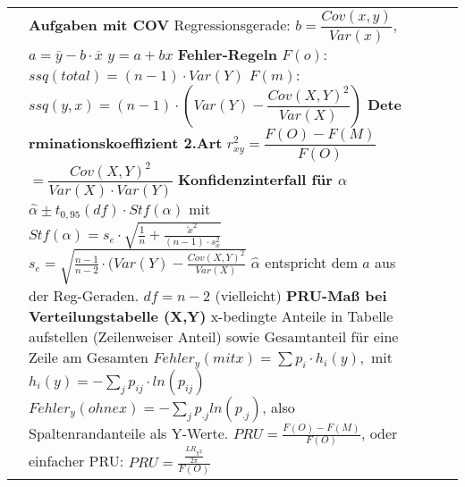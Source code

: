 \documentclass[fleqn, oneside, 10pt, titlepage]{article}
\begin{document}
{\begin{tabularx}{\textwidth}{p{13em}p{13em}p{13em}p{13em}p{10em}}
 &
\textbf{Aufgaben mit COV} \newline
Regressionsgerade: $ b = \dfrac{Cov(x,y)}{Var(x)}$,
$ a = \overline{y} - b \cdot \overline{x} $
$y = a + bx$ \newline
\textbf{Fehler-Regeln} \newline
$F(o):$\newline  $ssq(total) = (n-1) \cdot Var(Y)$ \newline
$F(m):$ \newline $  ssq(y,x) = (n-1) \cdot (Var(Y) - \dfrac{Cov(X,Y)^2}{Var(X)})$ \newline
\textbf{Dete rminationskoeffizient 2.Art} \newline
$r^2_{xy} = \dfrac{F(O) - F(M)}{F(O)}$ \newline $= \dfrac{Cov(X,Y)^2}{Var(X) \cdot Var(Y)}$ \newline
\textbf{Konfidenzinterfall für $\alpha$} \newline
$\hat{\alpha} \pm t_{0,95} (df) \cdot Stf(\alpha)$   mit \newline
$Stf(\alpha) = s_e \cdot \sqrt{\frac{1}{n} + \frac{\overleftarrow{x}^2}{(n-1) \cdot s^2_x}}$ \newline
$s_e = \sqrt{\frac{n-1}{n-2} \cdot (Var(Y) - \frac{Cov(X,Y)^2}{Var(X)}}$ \newline
$ \hat{\alpha}$ entspricht dem $a$ aus der Reg-Geraden. \newline 
$df = n-2$ (vielleicht) \newline 
\newline
\newline
\textbf{PRU-Maß bei Verteilungstabelle (X,Y)}\newline
x-bedingte Anteile in Tabelle aufstellen (Zeilenweiser Anteil) \newline
sowie Gesamtanteil für eine Zeile am Gesamten \newline
$Fehler_y(mit x) =  \sum p_i \cdot h_i(y),$ mit \newline
$h_i(y) = - \sum_j p_{ij} \cdot ln(p_{ij})$
$Fehler_y(ohne x) = - \sum_j p_{.j} ln(p_{.j})$, \newline
also Spaltenrandanteile als Y-Werte. \newline
$PRU = \frac{F(O) - F(M)}{F(O)}$, oder \newline
einfacher PRU: $PRU = \frac{\frac{LR_{\chi^2}}{2 \pi}}{F(O)}$
 \newline
 \newline
 

\end{tabularx}}
\end{document}
